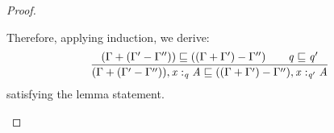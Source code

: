 \begin{proof}
\begin{enumerate}
    Therefore, applying induction, we derive:
     \begin{align*}
      \dfrac{\GRANULEsym{(}  \Gamma  \GRANULEsym{+}  \GRANULEsym{(}  \Gamma'  \GRANULEsym{-}  \Gamma''  \GRANULEsym{)}  \GRANULEsym{)} \sqsubseteq \GRANULEsym{(}  \GRANULEsym{(}  \Gamma  \GRANULEsym{+}  \Gamma'  \GRANULEsym{)}  \GRANULEsym{-}  \Gamma''  \GRANULEsym{)} \qquad \GRANULEnt{q} \sqsubseteq \GRANULEnt{q'}}
             {\GRANULEsym{(}  \Gamma  \GRANULEsym{+}  \GRANULEsym{(}  \Gamma'  \GRANULEsym{-}  \Gamma''  \GRANULEsym{)}  \GRANULEsym{)}  \GRANULEsym{,}   \GRANULEmv{x}  :_{\textcolor{coeffectColor}{  \GRANULEnt{q}  } }   \GRANULEnt{A} \sqsubseteq \GRANULEsym{(}  \GRANULEsym{(}  \Gamma  \GRANULEsym{+}  \Gamma'  \GRANULEsym{)}  \GRANULEsym{-}  \Gamma''  \GRANULEsym{)}  \GRANULEsym{,}   \GRANULEmv{x}  :_{\textcolor{coeffectColor}{  \GRANULEnt{q'}  } }   \GRANULEnt{A}}
     \end{align*}
    satisfying the lemma statement.

  \end{enumerate}
\end{proof}

